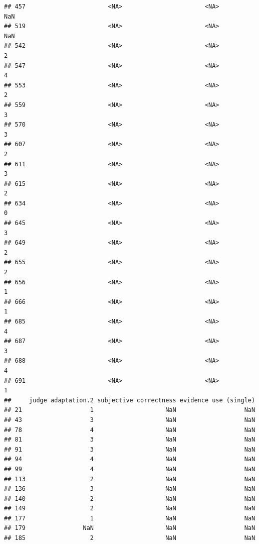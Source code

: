 \documentclass[
]{article}
\begin{document}
\begin{verbatim}
## 457                       <NA>                       <NA>                NaN
## 519                       <NA>                       <NA>                NaN
## 542                       <NA>                       <NA>                  2
## 547                       <NA>                       <NA>                  4
## 553                       <NA>                       <NA>                  2
## 559                       <NA>                       <NA>                  3
## 570                       <NA>                       <NA>                  3
## 607                       <NA>                       <NA>                  2
## 611                       <NA>                       <NA>                  3
## 615                       <NA>                       <NA>                  2
## 634                       <NA>                       <NA>                  0
## 645                       <NA>                       <NA>                  3
## 649                       <NA>                       <NA>                  2
## 655                       <NA>                       <NA>                  2
## 656                       <NA>                       <NA>                  1
## 666                       <NA>                       <NA>                  1
## 685                       <NA>                       <NA>                  4
## 687                       <NA>                       <NA>                  3
## 688                       <NA>                       <NA>                  4
## 691                       <NA>                       <NA>                  1
##     judge adaptation.2 subjective correctness evidence use (single)
## 21                   1                    NaN                   NaN
## 43                   3                    NaN                   NaN
## 78                   4                    NaN                   NaN
## 81                   3                    NaN                   NaN
## 91                   3                    NaN                   NaN
## 94                   4                    NaN                   NaN
## 99                   4                    NaN                   NaN
## 113                  2                    NaN                   NaN
## 136                  3                    NaN                   NaN
## 140                  2                    NaN                   NaN
## 149                  2                    NaN                   NaN
## 177                  1                    NaN                   NaN
## 179                NaN                    NaN                   NaN
## 185                  2                    NaN                   NaN

\end{verbatim}
\end{document}
